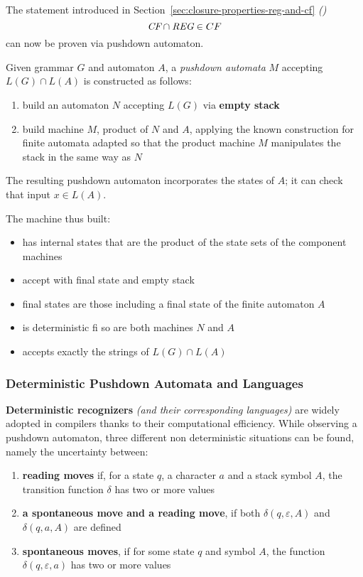 \documentclass[english]{article}
\begin{document}
The statement introduced in Section~\ref{sec:closure-properties-reg-and-cf} \textit{()}
\[ \textit{CF} \cap \textit{REG} \in CF \]
can now be proven via pushdown automaton.

Given grammar \(G\) and automaton \(A\), a \textit{pushdown automata} \(M\) accepting \(L(G) \cap L(A)\) is constructed as follows:

\begin{enumerate}
  \item build an automaton \(N\) accepting \(L(G)\) via \textbf{empty stack}
  \item build machine \(M\), product of \(N\) and \(A\), applying the known construction for finite automata adapted so that the product machine \(M\) manipulates the stack in the same way as \(N\)
\end{enumerate}

The resulting pushdown automaton incorporates the states of \(A\);
it can check that input \(x \in L(A)\).

The machine thus built:

\begin{itemize}
  \item has internal states that are the product of the state sets of the component machines
  \item accept with final state and empty stack
  \item final states are those including a final state of the finite automaton \(A\)
  \item is deterministic fi so are both machines \(N\) and \(A\)
  \item accepts exactly the strings of \(L(G) \cap L(A)\)
\end{itemize}

\subsubsection{Deterministic Pushdown Automata and Languages}

\textbf{Deterministic recognizers} \textit{(and their corresponding languages)} are widely adopted in compilers thanks to their computational efficiency.
While observing a pushdown automaton, three different non deterministic situations can be found, namely the uncertainty between:

\begin{enumerate}
  \item \textbf{reading moves} if, for a state \(q\), a character \(a\) and a stack symbol \(A\), the transition function \(\delta\) has two or more values
  \item \textbf{a spontaneous move and a reading move}, if both \(\delta(q, \varepsilon, A)\) and \(\delta(q, a, A)\) are defined
  \item \textbf{spontaneous moves}, if for some state \(q\) and symbol \(A\), the function \(\delta(q, \varepsilon, a)\) has two or more values
\end{enumerate}
\end{document}
